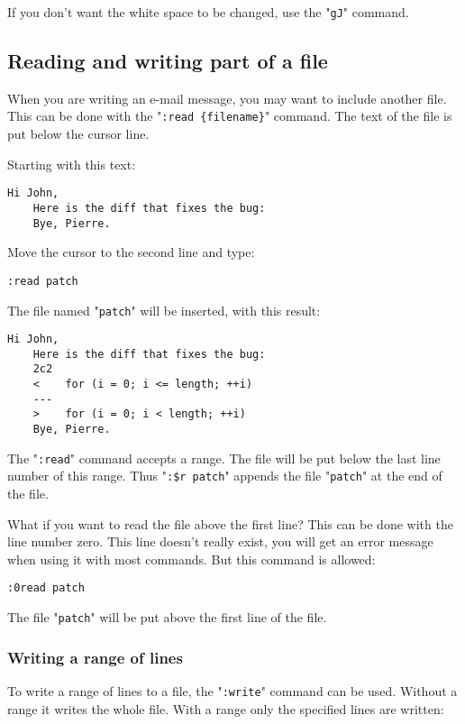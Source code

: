 If you don't want the white space to be changed, use the "\texttt{gJ}" command.
\subsection{Reading and writing part of a file}
When you are writing an e-mail message, you may want to include another file.
This can be done with the "\texttt{:read \{filename\}}" command.
The text of the file is put below the cursor line.

Starting with this text:

\begin{Verbatim}[samepage=true]
    Hi John, 
    Here is the diff that fixes the bug: 
    Bye, Pierre. 
\end{Verbatim}

Move the cursor to the second line and type:

\begin{Verbatim}[samepage=true]
 :read patch
\end{Verbatim}

The file named "\texttt{patch}" will be inserted, with this result:

\begin{Verbatim}[samepage=true]
    Hi John, 
    Here is the diff that fixes the bug: 
    2c2 
    <    for (i = 0; i <= length; ++i) 
    --- 
    >    for (i = 0; i < length; ++i) 
    Bye, Pierre. 
\end{Verbatim}

The "\texttt{:read}" command accepts a range.
The file will be put below the last line number of this range.
Thus "\texttt{:\$r patch}" appends the file "\texttt{patch}" at the end of the file.

What if you want to read the file above the first line?  This can be done with the line number zero.
This line doesn't really exist, you will get an error message when using it with most commands.
But this command is allowed:

\begin{Verbatim}[samepage=true]
 :0read patch
\end{Verbatim}

The file "\texttt{patch}" will be put above the first line of the file.
\subsubsection{Writing a range of lines}
To write a range of lines to a file, the "\texttt{:write}" command can be used.
Without a range it writes the whole file.
With a range only the specified lines are written:

